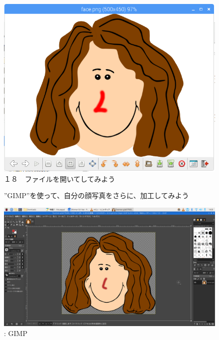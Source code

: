 \documentclass[a4paper,12pt]{jarticle}
\begin{document}
\begin{figure}
    \bigskip
    \begin{minipage}{0.45\linewidth}
      \includegraphics[width=0.9\linewidth]{textbook-img139.png}\\
      １８　ファイルを開いてしてみよう
    \end{minipage}

\theQuestion

”GIMP”を使って、自分の顔写真をさらに、加工してみよう

  \centering
  \begin{minipage}{0.5\textwidth}
    {\upshape
      \includegraphics[width=\linewidth]{textbook-img131.png}
      \newline
      : GIMP}
  \end{minipage}
\end{figure}


\clearpage
\end{document}
